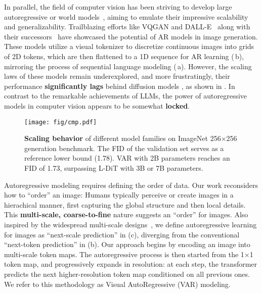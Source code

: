 In parallel, the field of computer vision has been striving to develop large autoregressive or world models~\cite{unified-io,lu2023unifiedio2,lvm}, aiming to emulate their impressive scalability and generalizability.
Trailblazing efforts like VQGAN and DALL-E~\cite{vqgan,dalle1} along with their successors~\cite{vqvae2,vit-vqgan,rq,movq} have showcased the potential of AR models in image generation. These models utilize a visual tokenizer to discretize continuous images into grids of 2D tokens, which are then flattened to a 1D sequence for AR learning (\,b), mirroring the process of sequential language modeling (\,a).
However, the scaling laws of these models remain underexplored, and more frustratingly, their performance \textbf{significantly lags} behind diffusion models \cite{dit,dit-github,rcg}, as shown in .
In contrast to the remarkable achievements of LLMs, the power of autoregressive models in computer vision appears to be somewhat \textbf{locked}.

\begin{wrapfigure}[18]{r}{0.49\textwidth}
\centering
\vspace{-8pt}
\texttt{[image: fig/cmp.pdf]}
\vspace{-12pt}
\caption{\small
\textbf{Scaling behavior} of different model families on ImageNet 256$\times$256 generation benchmark.
The FID of the validation set serves as a reference lower bound (1.78).
VAR with 2B parameters reaches an FID of 1.73, surpassing L-DiT with 3B or 7B parameters.
}
\label{fig:cmp}
\end{wrapfigure}

Autoregressive modeling requires defining the order of data.
Our work reconsiders how to ``order'' an image:
Humans typically perceive or create images in a hierachical manner, first capturing the global structure and then local details.
This \textbf{multi-scale, coarse-to-fine} nature suggests an ``order'' for images.
Also inspired by the widespread multi-scale designs~\cite{sift,fpn,spark,pggan}, we define autoregressive learning for images as ``next-scale prediction'' in  (c), diverging from the conventional ``next-token prediction'' in  (b).
Our approach begins by encoding an image into multi-scale token maps. The autoregressive process is then started from the 1$\times$1 token map, and progressively expands in resolution: at each step, the transformer predicts the next higher-resolution token map conditioned on all previous ones.
We refer to this methodology as Visual AutoRegressive (VAR) modeling.


